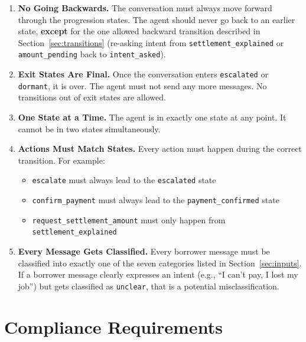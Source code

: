 \documentclass[11pt, a4paper]{article}
\begin{document}
\begin{enumerate}[leftmargin=*, label=\textbf{I\arabic*.}]

\item \textbf{No Going Backwards.}
The conversation must always move forward through the progression states. The agent should never go back to an earlier state, \textbf{except} for the one allowed backward transition described in Section~\ref{sec:transitions} (re-asking intent from \texttt{settlement\_explained} or \texttt{amount\_pending} back to \texttt{intent\_asked}).

\item \textbf{Exit States Are Final.}
Once the conversation enters \texttt{escalated} or \texttt{dormant}, it is over. The agent must not send any more messages. No transitions out of exit states are allowed.

\item \textbf{One State at a Time.}
The agent is in exactly one state at any point. It cannot be in two states simultaneously.

\item \textbf{Actions Must Match States.}
Every action must happen during the correct transition. For example:
\begin{itemize}[nosep]
  \item \texttt{escalate} must always lead to the \texttt{escalated} state
  \item \texttt{confirm\_payment} must always lead to the \texttt{payment\_confirmed} state
  \item \texttt{request\_settlement\_amount} must only happen from \texttt{settlement\_explained}
\end{itemize}

\item \textbf{Every Message Gets Classified.}
Every borrower message must be classified into exactly one of the seven categories listed in Section~\ref{sec:inputs}. If a borrower message clearly expresses an intent (e.g., ``I can't pay, I lost my job'') but gets classified as \texttt{unclear}, that is a potential misclassification.

\end{enumerate}

\section{Compliance Requirements}
\label{sec:compliance}
\end{document}
